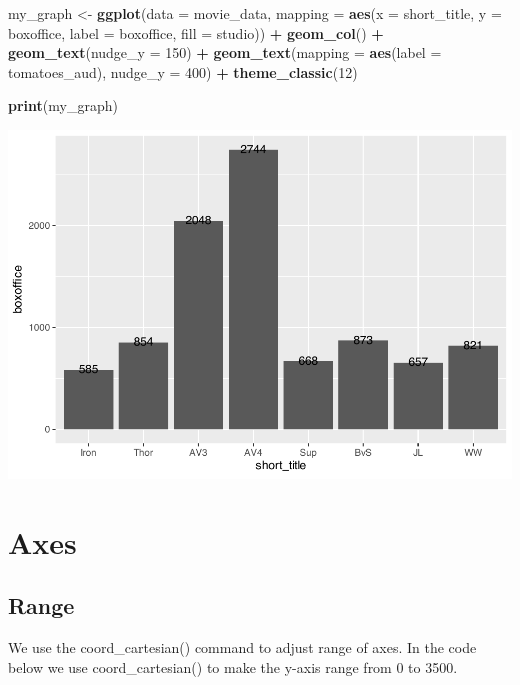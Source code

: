 \documentclass[
]{krantz}
\makeatletter
\newenvironment{Shaded}{\begin{snugshade}}{\end{snugshade}}
\newcommand{\DataTypeTok}[1]{\textcolor[rgb]{0.27,0.27,0.27}{#1}}
\newcommand{\DecValTok}[1]{\textcolor[rgb]{0.06,0.06,0.06}{#1}}
\newcommand{\KeywordTok}[1]{\textcolor[rgb]{0.27,0.27,0.27}{\textbf{#1}}}
\newcommand{\NormalTok}[1]{#1}
\newcommand{\OperatorTok}[1]{\textcolor[rgb]{0.43,0.43,0.43}{\textbf{#1}}}
\newcommand{\StringTok}[1]{\textcolor[rgb]{0.5,0.5,0.5}{#1}}
\newenvironment{kframe}{%
\medskip{}
\setlength{\fboxsep}{.8em}
 \def\at@end@of@kframe{}%
 \ifinner\ifhmode%
  \def\at@end@of@kframe{\end{minipage}}%
  \begin{minipage}{\columnwidth}%
 \fi\fi%
 \def\FrameCommand##1{\hskip\@totalleftmargin \hskip-\fboxsep
 \colorbox{shadecolor}{##1}\hskip-\fboxsep
     \hskip-\linewidth \hskip-\@totalleftmargin \hskip\columnwidth}%
 \MakeFramed {\advance\hsize-\width
   \@totalleftmargin\z@ \linewidth\hsize
   \@setminipage}}%
 {\par\unskip\endMakeFramed%
 \at@end@of@kframe}
\renewenvironment{Shaded}{\begin{kframe}}{\end{kframe}}
\makeatother
\begin{document}
\begin{Shaded}
\begin{Highlighting}[]
\NormalTok{my_graph <-}\StringTok{ }\KeywordTok{ggplot}\NormalTok{(}\DataTypeTok{data =}\NormalTok{ movie_data,}
           \DataTypeTok{mapping =} \KeywordTok{aes}\NormalTok{(}\DataTypeTok{x =}\NormalTok{ short_title,}
                         \DataTypeTok{y =}\NormalTok{ boxoffice,}
                         \DataTypeTok{label =}\NormalTok{ boxoffice, }
                         \DataTypeTok{fill =}\NormalTok{ studio)) }\OperatorTok{+}
\StringTok{  }\KeywordTok{geom_col}\NormalTok{() }\OperatorTok{+}
\StringTok{  }\KeywordTok{geom_text}\NormalTok{(}\DataTypeTok{nudge_y =} \DecValTok{150}\NormalTok{)  }\OperatorTok{+}
\StringTok{  }\KeywordTok{geom_text}\NormalTok{(}\DataTypeTok{mapping =} \KeywordTok{aes}\NormalTok{(}\DataTypeTok{label =}\NormalTok{ tomatoes_aud), }
            \DataTypeTok{nudge_y =} \DecValTok{400}\NormalTok{) }\OperatorTok{+}
\StringTok{  }\KeywordTok{theme_classic}\NormalTok{(}\DecValTok{12}\NormalTok{)}

\KeywordTok{print}\NormalTok{(my_graph)}
\end{Highlighting}
\end{Shaded}

\includegraphics[width=0.65\linewidth]{bookdown_files/figure-latex/unnamed-chunk-115-1}

\hypertarget{axes}{%
\section{Axes}\label{axes}}

\hypertarget{range}{%
\subsection{Range}\label{range}}

We use the coord\_cartesian() command to adjust range of axes. In the code below we use coord\_cartesian() to make the y-axis range from 0 to 3500.
\end{document}
